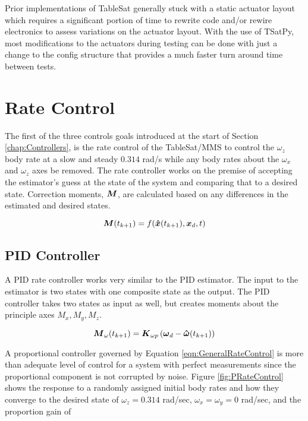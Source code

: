 Prior implementations of TableSat generally stuck with a static actuator layout which requires a significant portion of time to rewrite code and/or rewire electronics to assess variations on the actuator layout.  With the use of TSatPy, most modifications to the actuators during testing can be done with just a change to the config structure that provides a much faster turn around time between tests.

\section{Rate Control}
\label{sec:RateControl}

The first of the three controls goals introduced at the start of Section \ref{chap:Controllers}, is the rate control of the TableSat/MMS to control the $\omega_z$ body rate at a slow and steady $0.314$ rad/s while any body rates about the $\omega_x$ and $\omega_z$ axes be removed.  The rate controller works on the premise of accepting the estimator's guess at the state of the system and comparing that to a desired state.  Correction moments, $\boldsymbol{M}$, are calculated based on any differences in the estimated and desired states.

\begin{equation}
  \boldsymbol{M}(t_{k+1}) = f(\boldsymbol{\hat{x}}(t_{k+1}), \boldsymbol{x}_d, t)
  \label{eqn:GeneralRateControl}
\end{equation}

\subsection{PID Controller}
\label{subsec:PIDRateControl}

A PID rate controller works very similar to the PID estimator.  The input to the estimator is two states with one composite state as the output.  The PID controller takes two states as input as well, but creates moments about the principle axes $M_x, M_y, M_z$.

\begin{equation}
  \boldsymbol{M}_{\omega}(t_{k+1}) = \boldsymbol{K}_{\omega p} \left( \boldsymbol{\omega}_d - \boldsymbol{\hat{\omega}}(t_{k+1}) \right)
  \label{eqn:PIDRateControl}
\end{equation}

A proportional controller governed by Equation \ref{eqn:GeneralRateControl} is more than adequate level of control for a system with perfect measurements since the proportional component is not corrupted by noise.  Figure \ref{fig:PRateControl} shows the response to a randomly assigned initial body rates and how they converge to the desired state of $\omega_z = 0.314$ rad/sec, $\omega_x = \omega_y = 0$ rad/sec, and the proportion gain of

